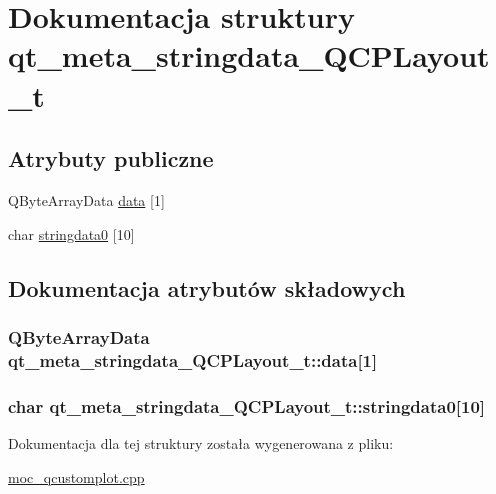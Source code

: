 \hypertarget{structqt__meta__stringdata___q_c_p_layout__t}{}\section{Dokumentacja struktury qt\+\_\+meta\+\_\+stringdata\+\_\+\+Q\+C\+P\+Layout\+\_\+t}
\label{structqt__meta__stringdata___q_c_p_layout__t}
\subsection*{Atrybuty publiczne}
\begin{DoxyCompactItemize}
\item 
Q\+Byte\+Array\+Data \hyperlink{structqt__meta__stringdata___q_c_p_layout__t_a133fdcad1faf8247b373a50c8dcb604f}{data} \mbox{[}1\mbox{]}
\item 
char \hyperlink{structqt__meta__stringdata___q_c_p_layout__t_ad487cc776f3a79ee6a9f10c234b3ade0}{stringdata0} \mbox{[}10\mbox{]}
\end{DoxyCompactItemize}


\subsection{Dokumentacja atrybutów składowych}
\subsubsection[{\texorpdfstring{data}{data}}]{\setlength{\rightskip}{0pt plus 5cm}Q\+Byte\+Array\+Data qt\+\_\+meta\+\_\+stringdata\+\_\+\+Q\+C\+P\+Layout\+\_\+t\+::data\mbox{[}1\mbox{]}}\hypertarget{structqt__meta__stringdata___q_c_p_layout__t_a133fdcad1faf8247b373a50c8dcb604f}{}\label{structqt__meta__stringdata___q_c_p_layout__t_a133fdcad1faf8247b373a50c8dcb604f}
\subsubsection[{\texorpdfstring{stringdata0}{stringdata0}}]{\setlength{\rightskip}{0pt plus 5cm}char qt\+\_\+meta\+\_\+stringdata\+\_\+\+Q\+C\+P\+Layout\+\_\+t\+::stringdata0\mbox{[}10\mbox{]}}\hypertarget{structqt__meta__stringdata___q_c_p_layout__t_ad487cc776f3a79ee6a9f10c234b3ade0}{}\label{structqt__meta__stringdata___q_c_p_layout__t_ad487cc776f3a79ee6a9f10c234b3ade0}


Dokumentacja dla tej struktury została wygenerowana z pliku\+:\begin{DoxyCompactItemize}
\item 
\hyperlink{moc__qcustomplot_8cpp}{moc\+\_\+qcustomplot.\+cpp}\end{DoxyCompactItemize}
